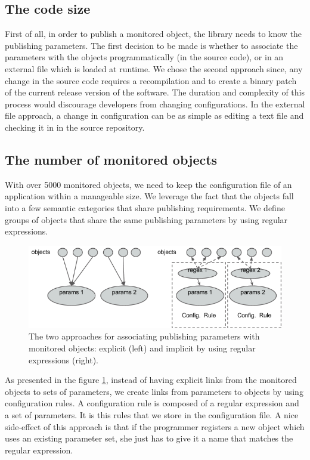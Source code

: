 \subsection*{The code size}

First of all, in order to publish a monitored object, the library needs to know the publishing parameters. The first decision to be made is whether to associate the parameters with the objects programmatically (in the source code), or in an external file which is loaded at runtime. We chose the second approach since, any change in the source code requires a recompilation and to create a binary patch of the current release version of the software. The duration and complexity of this process would discourage developers from changing configurations. In the external file approach, a change in configuration can be as simple as editing a text file and checking it in in the source repository.

\subsection*{The number of monitored objects}

With over 5000 monitored objects, we need to keep the configuration file of an application within a manageable size. We leverage the fact that the objects fall into a few semantic categories that share publishing requirements. We define groups of objects that share the same publishing parameters by using regular expressions. 

\begin{figure}[ht]
\centering
\includegraphics[scale=0.6]{../Images/oks_regex.png}
\caption[Publishing parameters association.]{The two approaches for associating publishing parameters with monitored objects: explicit (left) and implicit by using regular expressions (right).}
\label{fig:oks_regex}
\end{figure}

As presented in the figure \ref{fig:oks_regex}, instead of having explicit links from the monitored objects to sets of parameters, we create links from parameters to objects by using configuration rules. A configuration rule is composed of a regular expression and a set of parameters. It is this rules that we store in the configuration file. A nice side-effect of this approach is that if the programmer registers a new object which uses an existing parameter set, she just has to give it a name that matches the regular expression.

